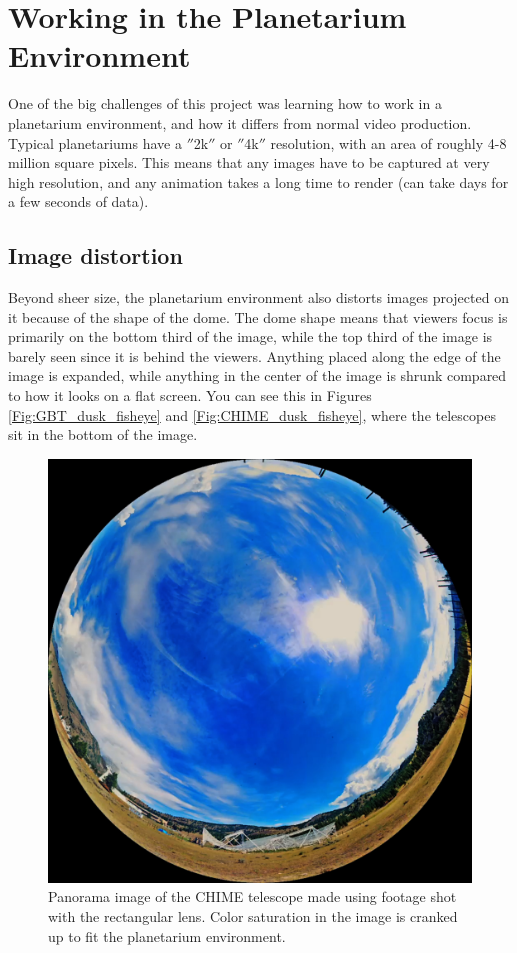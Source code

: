 \section{Working in the Planetarium Environment}
One of the big challenges of this project was learning how to work in a planetarium environment, and how it differs from normal video production. Typical planetariums have a $''$2k$''$ or $''$4k$''$ resolution, with an area of roughly 4-8 million square pixels. This means that any images have to be captured at very high resolution, and any animation takes a long time to render (can take days for a few seconds of data). 

\subsection{Image distortion}
Beyond sheer size, the planetarium environment also distorts images projected on it because of the shape of the dome. The dome shape means that viewers focus is primarily on the bottom third of the image, while the top third of the image is barely seen since it is behind the viewers. Anything placed along the edge of the image is expanded, while anything in the center of the image is shrunk compared to how it looks on a flat screen. You can see this in Figures \ref{Fig:GBT_dusk_fisheye} and \ref{Fig:CHIME_dusk_fisheye}, where the telescopes sit in the bottom of the image. 

\begin{figure}[htb]
\begin{center}
\includegraphics[width=0.95\linewidth]{Planetarium/figures/CHIME_day_dome.jpg}
\caption{Panorama image of the CHIME telescope made using footage shot with the rectangular lens. Color saturation in the image is cranked up to fit the planetarium environment.}
\label{Fig:CHIME_day}
\end{center}
\end{figure}

